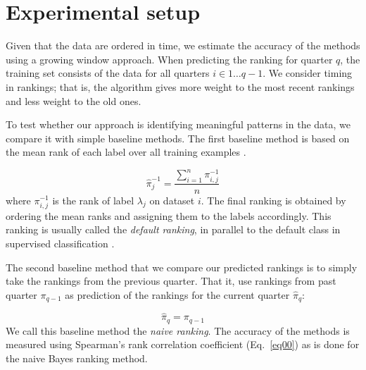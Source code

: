 \section{Experimental setup}
\label{sec:exp_setup}



Given that the data are ordered in time, we estimate the accuracy of the methods using a growing window approach. When predicting the ranking for quarter $q$, the training set consists of the data for all quarters $i \in 1 \ldots q-1$. We consider timing in rankings; that is, the algorithm gives more weight to the most recent rankings and less weight to the old ones. 

To test whether our approach is identifying meaningful patterns in the data, we compare it with simple baseline methods. The first baseline method is based on the mean rank of each label over all training examples \citep{brazdil2009}.

\begin{equation}
\label{default.rank}
\hat{\pi}^{-1}_{j} = \frac{\sum_{i=1}^n \pi^{-1}_{i,j}}{n}
\end{equation}
where $\pi^{-1}_{i,j}$ is the rank of label $\lambda_j$ on dataset $i$. The final ranking is obtained by ordering the mean ranks and assigning them to the labels accordingly. This ranking is usually called the \emph{default ranking}, in parallel to the default class in supervised classification \citep{mitchell1997}.

The second baseline method that we compare our predicted rankings is to simply  take  the rankings from the previous quarter. That it, use rankings from past quarter $\pi_{q-1}$ as prediction of the rankings for  the current quarter $\hat{\pi}_q$:

\begin{equation}
\label{naive:ranking}
\hat{\pi}_q=\pi_{q-1}
\end{equation}
We call this baseline method the \emph{naive ranking}. The accuracy of the methods is measured using Spearman's rank correlation coefficient (Eq.~\ref{eq00}) as is done for the naive Bayes ranking method.

